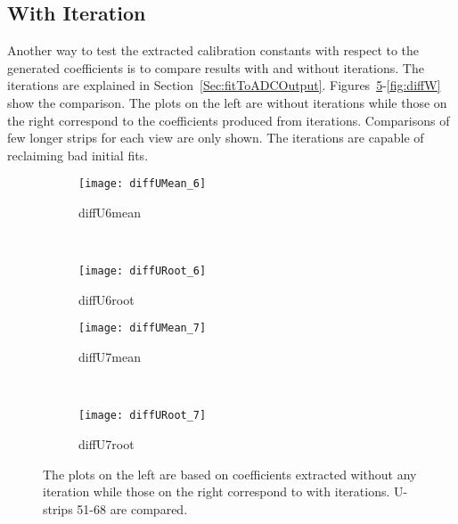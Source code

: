 \subsection{With Iteration}
Another way to test the extracted calibration constants with respect to the generated coefficients is to compare
results with and without iterations. The iterations are explained in Section~\ref{Sec:fitToADCOutput}.  Figures~\ref{fig:diffU}-\ref{fig:diffW}
 show the comparison. The plots on the left are without iterations while those on the right correspond to the 
 coefficients produced from iterations. Comparisons of few longer strips for each view are only shown. The iterations are capable of
 reclaiming bad initial fits.
\begin{figure}[h]
    \centering
    \begin{subfigure}[h]{0.44\textwidth}
        \centering
        \texttt{[image: diffUMean\_6]}
        \caption{diffU6mean}
        \label{fig:diffU6mean}
    \end{subfigure}
    ~
    \begin{subfigure}[h]{0.44\textwidth}
        \centering
        \texttt{[image: diffURoot\_6]}
        \caption{diffU6root}
        \label{fig:diffU6root}
    \end{subfigure}
    
    \begin{subfigure}[h]{0.44\textwidth}
        \centering
        \texttt{[image: diffUMean\_7]}
        \caption{diffU7mean}
        \label{fig:diffU7mean}
    \end{subfigure}
    ~
    \begin{subfigure}[h]{0.44\textwidth}
        \centering
        \texttt{[image: diffURoot\_7]}
        \caption{diffU7root}
        \label{fig:diffU7root}
    \end{subfigure}
    \caption{The plots on the left are based on coefficients extracted without any iteration while those on the right correspond to with 
    iterations. U-strips 51-68 are compared.}
    \label{fig:diffU}
\end{figure}
    

